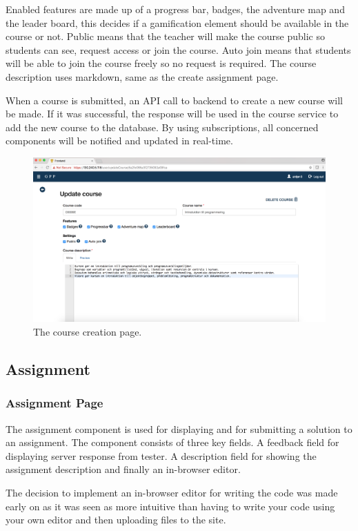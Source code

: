 Enabled features are made up of a progress bar, badges, the adventure map and the leader board, this decides if a gamification element should be available in the course or not. Public means that the teacher will make the course public so students can see, request access or join the course. Auto join means that students will be able to join the course freely so no request is required. The course description uses markdown, same as the create assignment page. 

When a course is submitted, an API call to backend to create a new course will be made. If it was successful, the response will be used in the course service to add the new course to the database. By using subscriptions, all concerned components will be notified and updated in real-time.
\begin{figure}[H]
    \centering
    \includegraphics[width=.5\textwidth]{img/gppinpictures/editcourse.png}
    \caption{The course creation page.}
\end{figure}

\subsection{Assignment}
\subsubsection{Assignment Page}
The assignment component is used for displaying and for submitting a solution to an assignment. The component consists of three key fields. A feedback field for displaying server response from tester. A description field for showing the assignment description and finally an in-browser editor. 

The decision to implement an in-browser editor for writing the code was made early on as it was seen as more intuitive than having to write your code using your own editor and then uploading files to the site.

